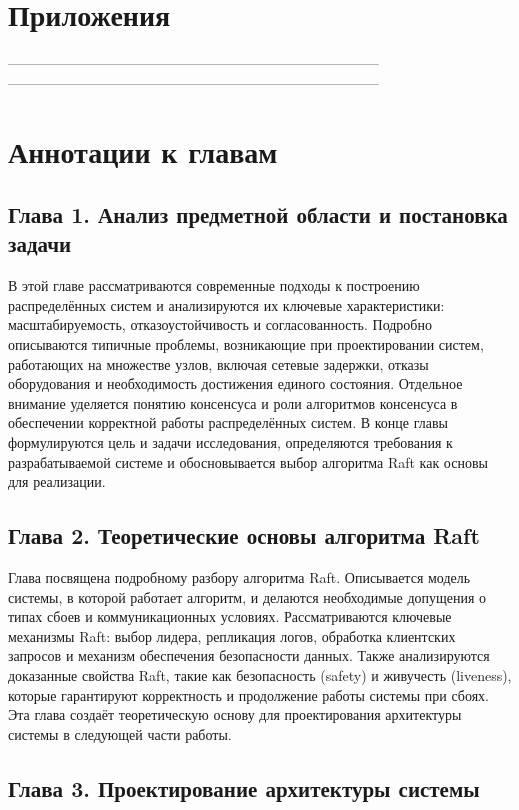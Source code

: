 \section*{Приложения}

--------------------------------------------------------------------------------
--------------------------------------------------------------------------------

\section*{Аннотации к главам}

\subsection*{Глава 1. Анализ предметной области и постановка задачи}

В этой главе рассматриваются современные подходы к построению распределённых
систем и анализируются их ключевые характеристики: масштабируемость,
отказоустойчивость и согласованность. Подробно описываются типичные проблемы,
возникающие при проектировании систем, работающих на множестве узлов, включая
сетевые задержки, отказы оборудования и необходимость достижения единого
состояния. Отдельное внимание уделяется понятию консенсуса и роли алгоритмов
консенсуса в обеспечении корректной работы распределённых систем. В конце главы
формулируются цель и задачи исследования, определяются требования к
разрабатываемой системе и обосновывается выбор алгоритма Raft как основы для
реализации.

\subsection*{Глава 2. Теоретические основы алгоритма Raft}

Глава посвящена подробному разбору алгоритма Raft. Описывается модель системы,
в которой работает алгоритм, и делаются необходимые допущения о типах сбоев и
коммуникационных условиях. Рассматриваются ключевые механизмы Raft: выбор
лидера, репликация логов, обработка клиентских запросов и механизм обеспечения
безопасности данных. Также анализируются доказанные свойства Raft, такие как
безопасность (safety) и живучесть (liveness), которые гарантируют корректность
и продолжение работы системы при сбоях. Эта глава создаёт теоретическую основу
для проектирования архитектуры системы в следующей части работы.

\subsection*{Глава 3. Проектирование архитектуры системы}

